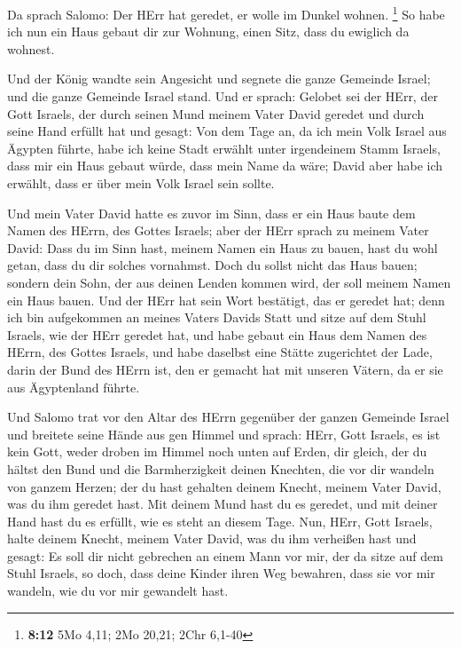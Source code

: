  Da sprach Salomo: Der HErr hat geredet, er wolle im Dunkel
wohnen. \footnote{\textbf{8:12} 5Mo 4,11; 2Mo 20,21; 2Chr 6,1-40}
 So habe ich nun ein Haus gebaut dir zur Wohnung, einen
Sitz, dass du ewiglich da wohnest.

 Und der König wandte sein Angesicht und segnete die ganze
Gemeinde Israel; und die ganze Gemeinde Israel stand.  Und
er sprach: Gelobet sei der HErr, der Gott Israels, der durch seinen Mund
meinem Vater David geredet und durch seine Hand erfüllt hat und gesagt:
 Von dem Tage an, da ich mein Volk Israel aus Ägypten
führte, habe ich keine Stadt erwählt unter irgendeinem Stamm Israels,
dass mir ein Haus gebaut würde, dass mein Name da wäre; David aber habe
ich erwählt, dass er über mein Volk Israel sein sollte.

 Und mein Vater David hatte es zuvor im Sinn, dass er ein
Haus baute dem Namen des HErrn, des Gottes Israels;  aber
der HErr sprach zu meinem Vater David: Dass du im Sinn hast, meinem
Namen ein Haus zu bauen, hast du wohl getan, dass du dir solches
vornahmst.  Doch du sollst nicht das Haus bauen; sondern
dein Sohn, der aus deinen Lenden kommen wird, der soll meinem Namen ein
Haus bauen.  Und der HErr hat sein Wort bestätigt, das er
geredet hat; denn ich bin aufgekommen an meines Vaters Davids Statt und
sitze auf dem Stuhl Israels, wie der HErr geredet hat, und habe gebaut
ein Haus dem Namen des HErrn, des Gottes Israels,  und habe
daselbst eine Stätte zugerichtet der Lade, darin der Bund des HErrn ist,
den er gemacht hat mit unseren Vätern, da er sie aus Ägyptenland führte.

 Und Salomo trat vor den Altar des HErrn gegenüber der
ganzen Gemeinde Israel und breitete seine Hände aus gen Himmel
 und sprach: HErr, Gott Israels, es ist kein Gott, weder
droben im Himmel noch unten auf Erden, dir gleich, der du hältst den
Bund und die Barmherzigkeit deinen Knechten, die vor dir wandeln von
ganzem Herzen;  der du hast gehalten deinem Knecht, meinem
Vater David, was du ihm geredet hast. Mit deinem Mund hast du es
geredet, und mit deiner Hand hast du es erfüllt, wie es steht an diesem
Tage.  Nun, HErr, Gott Israels, halte deinem Knecht, meinem
Vater David, was du ihm verheißen hast und gesagt: Es soll dir nicht
gebrechen an einem Mann vor mir, der da sitze auf dem Stuhl Israels, so
doch, dass deine Kinder ihren Weg bewahren, dass sie vor mir wandeln,
wie du vor mir gewandelt hast.

